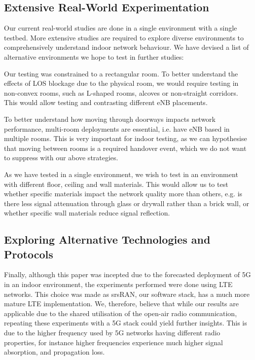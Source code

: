 \subsection{Extensive Real-World Experimentation}
Our current real-world studies are done in a single environment with a single testbed. More extensive studies are required to explore diverse environments to comprehensively understand indoor network behaviour. We have devised a list of alternative environments we hope to test in further studies:
\begin{description}[style=unboxed]
    \item[\textbf{Non-convex Rooms}] Our testing was constrained to a rectangular room. To better understand the effects of LOS blockage due to the physical room, we would require testing in non-convex rooms, such as L-shaped rooms, alcoves or non-straight corridors. This would allow testing and contrasting different eNB placements.
    \item[\textbf{Multi-room Deployments}] To better understand how moving through doorways impacts network performance, multi-room deployments are essential, i.e. have eNB based in multiple rooms. This is very important for indoor testing, as we can hypothesise that moving between rooms is a required handover event, which we do not want to suppress with our above strategies.
    \item[\textbf{Material Impact}] As we have tested in a single environment, we wish to test in an environment with different floor, ceiling and wall materials. This would allow us to test whether specific materials impact the network quality more than others, e.g. is there less signal attenuation through glass or drywall rather than a brick wall, or whether specific wall materials reduce signal reflection.
\end{description}

\subsection{Exploring Alternative Technologies and Protocols}
Finally, although this paper was incepted due to the forecasted deployment of 5G in an indoor environment, the experiments performed were done using LTE networks. This choice was made as srsRAN, our software stack, has a much more mature LTE implementation. We, therefore, believe that while our results are applicable due to the shared utilisation of the open-air radio communication, repeating these experiments with a 5G stack could yield further insights. This is due to the higher frequency used by 5G networks having different radio properties, for instance higher frequencies experience much higher signal absorption, and propagation loss.


